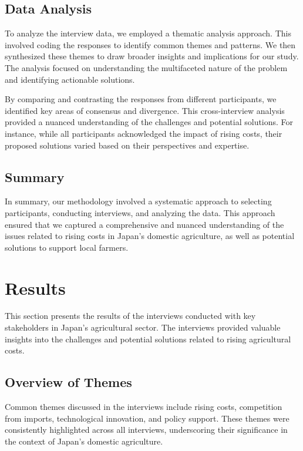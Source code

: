 \documentclass{article} %
\begin{document}
\subsection{Data Analysis}

To analyze the interview data, we employed a thematic analysis approach. This involved coding the responses to identify common themes and patterns. We then synthesized these themes to draw broader insights and implications for our study. The analysis focused on understanding the multifaceted nature of the problem and identifying actionable solutions.

By comparing and contrasting the responses from different participants, we identified key areas of consensus and divergence. This cross-interview analysis provided a nuanced understanding of the challenges and potential solutions. For instance, while all participants acknowledged the impact of rising costs, their proposed solutions varied based on their perspectives and expertise.

\subsection{Summary}

In summary, our methodology involved a systematic approach to selecting participants, conducting interviews, and analyzing the data. This approach ensured that we captured a comprehensive and nuanced understanding of the issues related to rising costs in Japan's domestic agriculture, as well as potential solutions to support local farmers.


\section{Results}
\label{sec:results}

This section presents the results of the interviews conducted with key stakeholders in Japan's agricultural sector. The interviews provided valuable insights into the challenges and potential solutions related to rising agricultural costs.

\subsection{Overview of Themes}

Common themes discussed in the interviews include rising costs, competition from imports, technological innovation, and policy support. These themes were consistently highlighted across all interviews, underscoring their significance in the context of Japan's domestic agriculture.
\end{document}
